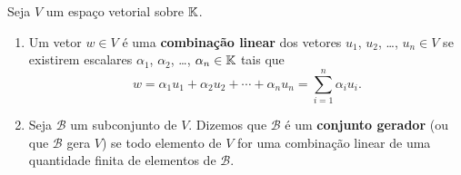 \begin{definicao}
	Seja $V$ um espa\c{c}o vetorial sobre $\mathbb{K}$.
	\begin{enumerate}[label={\roman*})]
		\item Um vetor $w \in V$ \'e uma \textbf{combina\c{c}\~ao linear} dos vetores $u_1$, $u_2$, \dots, $u_n \in V$ se existirem escalares 
			$\alpha_1$, $\alpha_2$, \dots, $\alpha_n \in \mathbb{K}$ tais que
		\[
			w = \alpha_1 u_1 + \alpha_2u_2 + \cdots + \alpha_nu_n = \sum_{i = 1}^n \alpha_iu_i.
		\]
		\item Seja $\mathcal{B}$ um subconjunto de $V$. Dizemos que $\mathcal{B}$ \'e um \textbf{conjunto gerador} (ou que $\mathcal{B}$ gera $V$) se todo elemento de $V$ for uma combina\c{c}\~ao linear de uma quantidade finita de elementos de $\mathcal{B}$.
	\end{enumerate}
\end{definicao}

